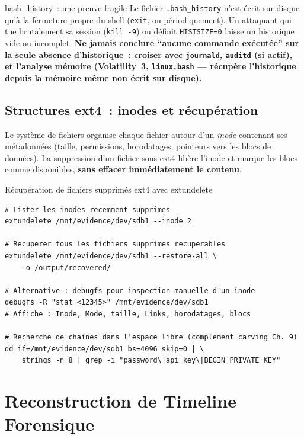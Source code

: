 \begin{boiteRemarque}{bash\_history~: une preuve fragile}
Le fichier \texttt{.bash\_history} n'est écrit sur disque qu'à la
fermeture propre du shell (\texttt{exit}, ou périodiquement). Un
attaquant qui tue brutalement sa session (\texttt{kill~-9}) ou
définit \texttt{HISTSIZE=0} laisse un historique vide ou incomplet.
\textbf{Ne jamais conclure ``aucune commande exécutée'' sur la seule
absence d'historique~: croiser avec \texttt{journald},
\texttt{auditd} (si actif), et l'analyse mémoire (Volatility~3,
\texttt{linux.bash} --- récupère l'historique depuis la mémoire
même non écrit sur disque).}
\end{boiteRemarque}

\subsection{Structures ext4~: inodes et récupération}

Le système de fichiers  organise chaque
fichier autour d'un \textit{inode} contenant ses métadonnées
(taille, permissions, horodatages, pointeurs vers les blocs de données).
La suppression d'un fichier sous ext4 libère l'inode et marque les blocs
comme disponibles, \textbf{sans effacer immédiatement le contenu}.

\begin{boxoutils}{Récupération de fichiers supprimés ext4 avec extundelete}
\begin{lstlisting}[language=bash_forensique]
# Lister les inodes recemment supprimes
extundelete /mnt/evidence/dev/sdb1 --inode 2

# Recuperer tous les fichiers supprimes recuperables
extundelete /mnt/evidence/dev/sdb1 --restore-all \
    -o /output/recovered/

# Alternative : debugfs pour inspection manuelle d'un inode
debugfs -R "stat <12345>" /mnt/evidence/dev/sdb1
# Affiche : Inode, Mode, taille, Links, horodatages, blocs

# Recherche de chaines dans l'espace libre (complement carving Ch. 9)
dd if=/mnt/evidence/dev/sdb1 bs=4096 skip=0 | \
    strings -n 8 | grep -i "password\|api_key\|BEGIN PRIVATE KEY"
\end{lstlisting}
\end{boxoutils}

\section{Reconstruction de Timeline Forensique}
\label{sec:timeline}

